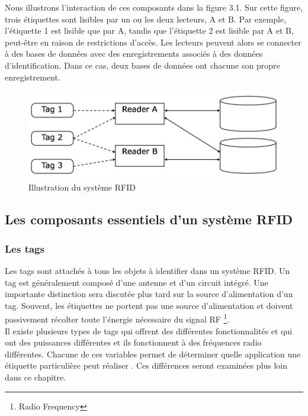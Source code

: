 \documentclass[11pt, a4paper, twoside]{book}
\begin{document}
Nous illustrons l'interaction de ces composants dans la figure 3.1. Sur cette figure, trois étiquettes sont lisibles par un ou les deux lecteurs, A et B. Par exemple, l'étiquette 1 est lisible que par A, tandis que l'étiquette 2 est lisible par A et B, peut-être en raison de restrictions d'accès. Les lecteurs peuvent alors se connecter à des bases de données avec des enregistrements associés à des données d'identification. Dans ce cas, deux bases de données ont chacune son propre enregistrement.\\
\begin{figure}[H]
\centering
\includegraphics[width=\textwidth]{shema}
\caption{Illustration du système RFID}
\end{figure}
\subsection{Les composants essentiels d'un système RFID}
\subsubsection{Les tags}
Les tags sont attachés à tous les objets à identifier dans un système RFID. Un tag est généralement
composé d'une antenne et d'un circuit intégré. Une importante
distinction sera discutée plus tard sur la source d'alimentation d'un tag. Souvent, les étiquettes ne portent pas une source d'alimentation et doivent passivement récolter toute l'énergie nécessaire du signal RF \footnote{Radio Frequency}.\\

Il existe plusieurs types de tags qui offrent des différentes fonctionnalités et qui ont des puissances différentes
et ils fonctionnent à des fréquences radio différentes. Chacune de ces variables permet de déterminer
quelle application une étiquette particulière peut réaliser . Ces différences seront examinées plus loin dans ce chapitre.\\
\end{document}
